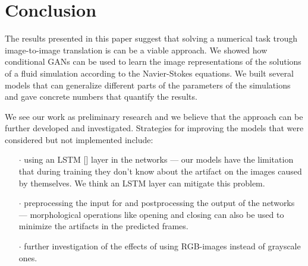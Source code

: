 \documentclass{llncs}
\begin{document}
\section{Conclusion}\label{conclusion}
The results presented in this paper suggest that solving a numerical task trough image-to-image translation is can be a viable approach. We showed how conditional GANs can be used to learn the image representations of the solutions of a fluid simulation according to the Navier-Stokes equations. We built several models that can generalize different parts of the parameters of the simulations and gave concrete numbers that quantify the results.

We see our work as preliminary research and we believe that the approach can be further developed and investigated. Strategies for improving the models that were considered but not implemented include:
\begin{itemize}
\item[$\cdot$] using an LSTM [] layer in the networks --- our models have the limitation that during training they don't know about the artifact on the images caused by themselves. We think an LSTM layer can mitigate this problem.
\item[$\cdot$] preprocessing the input for and postprocessing the output of the networks --- morphological operations like opening and closing can also be used to minimize the artifacts in the predicted frames.
\item[$\cdot$] further investigation of the effects of using RGB-images instead of grayscale ones. 
\end{itemize}

\clearpage


\end{document}
